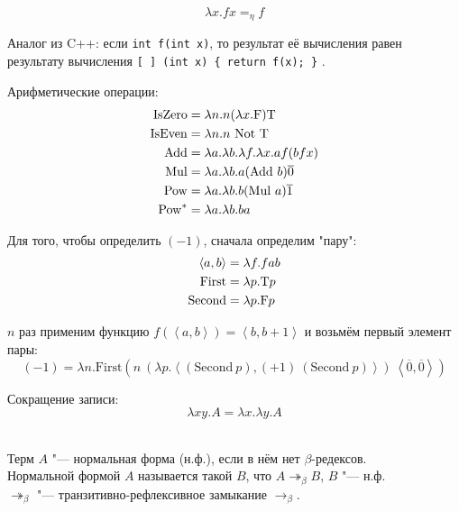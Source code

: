\begin{definition}
    \[
        \lambda x . f x =_{\eta} f
    \]
\end{definition}
Аналог из C++: если \lstinline$int f(int x)$, то результат её вычисления равен результату вычисления
    \lstinline$[ ] (int x) { return f(x); }$ .

Арифметические операции:
\begin{alignat*}{2}
    \mathrm{IsZero} &= \lambda{}n.n(\lambda{}x.\mathrm{F})\mathrm{T} \\
    \mathrm{IsEven} &= \lambda{}n.n\ \mathrm{Not}\ \mathrm{T} \\
    \mathrm{Add} &= \lambda{}a.\lambda{}b.\lambda{}f.\lambda{}x.a f (b f x) \\
    \mathrm{Mul} &= \lambda{}a.\lambda{}b.a (\mathrm{Add}\ b) \overline{0} \\
    \mathrm{Pow} &= \lambda{}a.\lambda{}b.b (\mathrm{Mul}\ a) \overline{1} \\
    \mathrm{Pow}^{*} &= \lambda{}a.\lambda{}b.b a
\end{alignat*}

Для того, чтобы определить $(-1)$, сначала определим "пару":
\begin{alignat*}{2}
    \left<a,b\right> &= \lambda f.f a b \\
    \mathrm{First} &= \lambda p . \mathrm{T} p \\
    \mathrm{Second} &= \lambda p . \mathrm{F} p
\end{alignat*}

$n$ раз применим функцию $f\left(\left<a,b\right>\right) = \left<b,b+1\right>$ и возьмём первый элемент пары:
\[
    (-1) = \lambda n . \mathrm{First} \left(n\ (\lambda p . \left<\left(\mathrm{Second}\ p\right), (+1)\ (\mathrm{Second}\ p)\right>)\
    \left<\overline{0},\overline{0}\right>\right)
\]

Сокращение записи:
\[
    \lambda x y . A = \lambda x . \lambda y . A
\]

\begin{definition} \mbox{} \\
    Терм $A$ "--- нормальная форма (н.ф.), если в нём нет $\beta$-редексов. \\
    Нормальной формой $A$ называется такой $B$, что $A \twoheadrightarrow_{\beta} B$, $B$ "--- н.ф. \\
    $\twoheadrightarrow_{\beta}$ "--- транзитивно-рефлексивное замыкание $\rightarrow_{\beta}$.
\end{definition}

